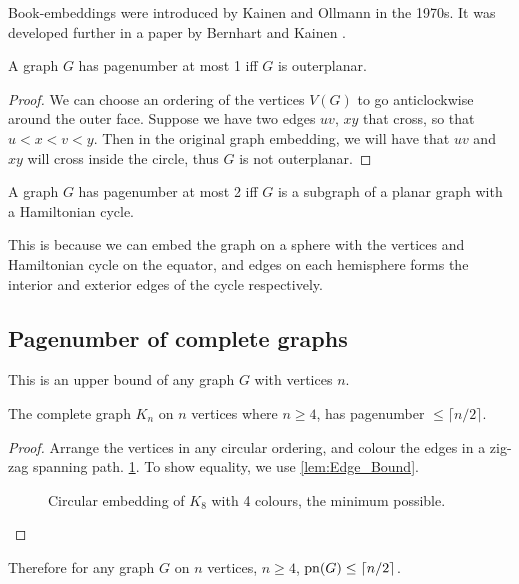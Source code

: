 Book-embeddings were introduced by Kainen and Ollmann in the 1970s.\cite{kainenRecentResultsTopological1974, ollmannBookThicknessVarious1973} It was developed further in a paper by Bernhart and Kainen \cite{bernhartBookThicknessGraph1979}. 
\begin{lemma}\label{lem:Pagenumber_1}
	A graph \(G\) has pagenumber at most 1 iff \(G\) is outerplanar.
\end{lemma}
\begin{proof}
	We can choose an ordering of the vertices \(V(G)\) to go anticlockwise around the outer face. Suppose we have two edges \(uv\), \(xy\) that cross, so that \(u < x < v < y\). Then in the original graph embedding, we will have that \(uv\) and \(xy\) will cross inside the circle, thus \(G\) is not outerplanar. 
\end{proof}
\begin{lemma}\label{lem:Pagenumber_2}
	A graph \(G\) has pagenumber at most 2 iff \(G\) is a subgraph of a planar graph with a Hamiltonian cycle.
\end{lemma}
This is because we can embed the graph on a sphere with the vertices and Hamiltonian cycle on the equator, and edges on each hemisphere forms the interior and exterior edges of the cycle respectively.

\subsection{Pagenumber of complete graphs}\label{ssec:Pagenumber_Complete_Graphs}
This is an upper bound of any graph \(G\) with vertices \(n\). 
\begin{theorem}\label{thm:Pagenumber_Complete_Graph}
	The complete graph \(K_n\) on \(n\) vertices where \(n \geq 4\), has pagenumber \( \leq \lceil n/2 \rceil \). 
\end{theorem}
\begin{proof}
	Arrange the vertices in any circular ordering, and colour the edges in a zig-zag spanning path. \cref{fig:k8 coloured with colours}. To show equality, we use \cref{lem:Edge_Bound}.
	\begin{figure}[ht]
		\caption{Circular embedding of \(K_8\) with 4 colours, the minimum possible.}
		\centering
		
		\label{fig:k8 coloured with colours}
	\end{figure}
\end{proof}
Therefore for any graph \(G\) on \(n\) vertices, \(n \geq 4\), \(\operatorname{pn}(G) \leq \lceil n/2 \rceil\). 
